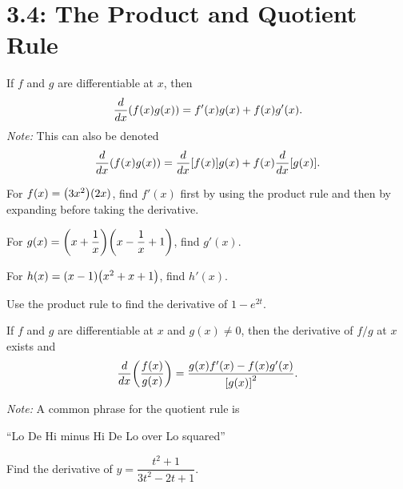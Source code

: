 \documentclass[../mathNotesPreamble]{subfiles}
\begin{document}
\section{3.4: The Product and Quotient Rule}
\begin{thmBox*}
  If $f$ and $g$ are differentiable at $x$, then 
    $$\dfrac{d}{dx}{\left(f(x)g(x)\right)}=f'(x)g(x)+f(x)g'(x).$$
  \textit{Note:} This can also be denoted 
    $$\dfrac{d}{dx}{\left(f(x)g(x)\right)}=\dfrac{d}{dx}{\left[f(x)\right]}g(x)+f(x)\dfrac{d}{dx}{\left[g(x)\right]}.$$
\end{thmBox*}
  
\begin{ex*}
  For $f(x)={\left(3x^2\right)}{\left(2x\right)}$, find $f'(x)$ first by using the product rule and then by expanding before taking the derivative.
\end{ex*}
\begin{ex*}
  For $g(x)={\left(x+\dfrac{1}{x}\right)}{\left(x-\dfrac{1}{x}+1\right)}$, find $g'(x)$.
\end{ex*}
\begin{ex*}
  For $h(x)={\left(x-1\right)}{\left(x^2+x+1\right)}$, find $h'(x)$.
\end{ex*}
\pagebreak

\begin{ex*}
  Use the product rule to find the derivative of $1-e^{2t}$.
\end{ex*}

\begin{thmBox*}
  If $f$ and $g$ are differentiable at $x$ and $g(x)\neq 0$, then the derivative of $f/g$ at $x$ exists and 
    $$\dfrac{d}{dx}{\left(\dfrac{f(x)}{g(x)}\right)}=\dfrac{g(x)f'(x)-f(x)g'(x)}{{\left[g(x)\right]}^2}.$$
  
  \textit{Note:} A common phrase for the quotient rule is
  
  {\centering ``Lo De Hi minus Hi De Lo over Lo squared'' \par}
\end{thmBox*}

\begin{ex*}
  Find the derivative of $y=\dfrac{t^2+1}{3t^2-2t+1}$.
\end{ex*}
\pagebreak
\end{document}
